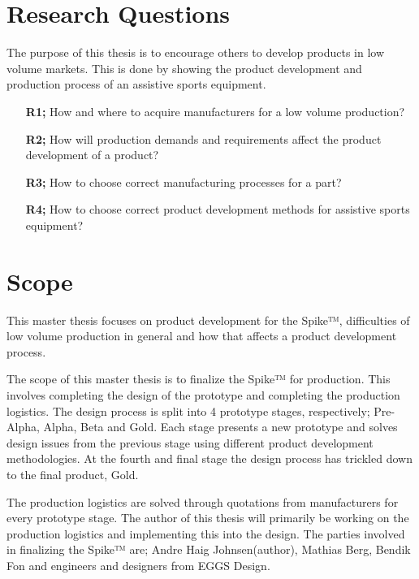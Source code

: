 \section{Research Questions}
The purpose of this thesis is to encourage others to develop products in low volume markets. This is done by showing the product development and production process of an assistive sports equipment.
\begin{itemize}
    \item [\textbf{R1;}] How and where to acquire manufacturers for a low volume production? 
    \vspace{0.5cm}
    \item [\textbf{R2;}] How will production demands and requirements affect the product development of a product? 
    \vspace{0.5cm}
    \item [\textbf{R3;}] How to choose correct manufacturing processes for a part? 
    
    \vspace{0.5cm}
    \item [\textbf{R4;}] How to choose correct product development methods for assistive sports equipment?  
\end{itemize}


\section{Scope}

This master thesis focuses on product development for the Spike™, difficulties of low volume production in general and how that affects a product development process. 

The scope of this master thesis is to finalize the Spike™ for production. This involves completing the design of the prototype and completing the production logistics. The design process is split into 4 prototype stages, respectively; Pre-Alpha, Alpha, Beta and Gold. Each stage presents a new prototype and solves design issues from the previous stage using different product development methodologies. At the fourth and final stage the design process has trickled down to the final product, Gold.
\par
The production logistics are solved through quotations from manufacturers for every prototype stage. The author of this thesis will primarily be working on the production logistics and implementing this into the design. The parties involved in finalizing the Spike™ are; Andre Haig Johnsen(author), Mathias Berg, Bendik Fon and engineers and designers from EGGS Design. 




